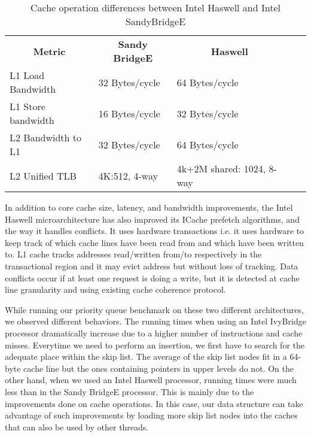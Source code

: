 \begin{table}[ht]
\footnotesize
\begin{tabular}{|l|l|l|ll}
\cline{1-3}
\multicolumn{1}{|c|}{\textbf{Metric}} & \multicolumn{1}{c|}{\textbf{Sandy BridgeE}} & \multicolumn{1}{c|}{\textbf{Haswell}} &  &  \\ \cline{1-3}
L1 Load Bandwidth                     & 32 Bytes/cycle                           & 64 Bytes/cycle                        &  &  \\ \cline{1-3}
L1 Store bandwidth                    & 16 Bytes/cycle                           & 32 Bytes/cycle                        &  &  \\ \cline{1-3}
L2 Bandwidth to L1                    & 32 Bytes/cycle                           & 64 Bytes/cycle                        &  &  \\ \cline{1-3}
L2 Unified TLB                        & 4K:512, 4-way                            & 4k+2M shared: 1024, 8-way             &  &  \\ \cline{1-3}
\end{tabular}
\caption{Cache operation differences between Intel Haswell and Intel SandyBridgeE}
\label{tab:haswell_ivy}
\end{table}

In addition to core cache size, latency, and bandwidth improvements, the Intel Haswell microarchitecture has also improved its ICache prefetch algorithms, and the way it handles conflicts. It uses hardware transactions i.e. it uses hardware to keep track of which cache lines have been read from and which have been written to. L1 cache tracks addresses read/written from/to respectively in the transactional region and it may evict address but without loss of tracking. Data conflicts occur if at least one request is doing a write, but it is detected at cache line granularity and using existing cache coherence protocol.%

While running our priority queue benchmark on these two different architectures, we observed different behaviors. The running times when using an Intel IvyBridge processor dramatically increase due to a higher number of instructions and cache misses. Everytime we need to perform an insertion, we first have to search for the adequate place within the skip list. The average of the skip list nodes fit in a 64-byte cache line but the ones containing pointers in upper levels do not. On the other hand, when we used an Intel Haswell processor, running times were much less than in the Sandy BridgeE processor. This is mainly due to the improvements done on cache operations. In this case, our data structure can take advantage of such improvements by loading more skip list nodes into the caches that can also be used by other threads.

